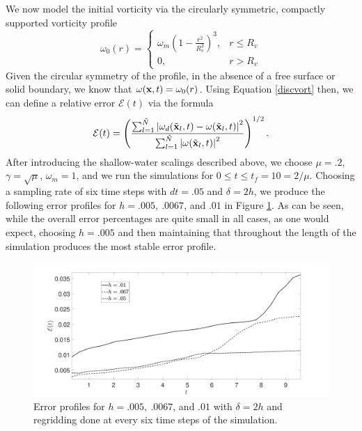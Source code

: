 \documentclass[a4paper,11pt]{article}
\newcommand{\ba}{\begin{array}}
\newcommand{\ea}{\end{array}}
\begin{document}
We now model the initial vorticity via the circularly symmetric, compactly supported vorticity profile
\[
\omega_{0}(r) =\left\{  \ba{rl}  \omega_{m}\left(1-\frac{r^{2}}{R_{v}^{2}}\right)^{3}, & r\leq R_{v} \\ 0, & r>R_{v} \ea\right.
\] 
Given the circular symmetry of the profile, in the absence of a free surface or solid boundary, we know that $\omega({\bf x},t) = \omega_{0}(r)$.  Using Equation \eqref{discvort} then, we can define a relative error $\mathcal{E}(t)$ via the formula 
\[
\mathcal{E}(t) = \left(\frac{\sum_{l=1}^{\tilde{N}}\left|\omega_{d}(\tilde{\bf x}_{l},t) - \omega(\tilde{\bf x}_{l},t) \right|^{2}}{\sum_{l=1}^{\tilde{N}}\left|\omega(\tilde{\bf x}_{l},t) \right|^{2}} \right)^{1/2}.
\]
After introducing the shallow-water scalings described above, we choose $\mu=.2$, $\gamma=\sqrt{\mu}$, $\omega_{m}=1$, and we run the simulations for $0\leq t \leq t_{f}=10 = 2/\mu$.  Choosing a sampling rate of six time steps with $dt=.05$ and $\delta = 2h$, we produce the following error profiles for $h=.005, ~ .0067$, and $.01$ in Figure \ref{fig:err_prof}.  As can be seen, while the overall error percentages are quite small in all cases, as one would expect, choosing $h=.005$ and then maintaining that throughout the length of the simulation produces the most stable error profile.  
\begin{figure}[!h]
\centering
\includegraphics[width=.85\textwidth]{full_error_comparison}
\caption{Error profiles for $h=.005, ~ .0067$, and $.01$ with $\delta=2h$ and regridding done at every six time steps of the simulation.}
\label{fig:err_prof}
\end{figure}
\end{document}
